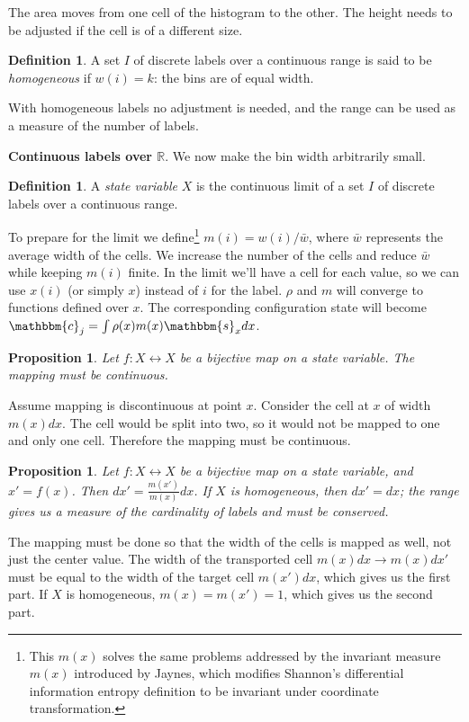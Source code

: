 \documentclass[aps,twocolumn,floatfix,nofootinbib]{revtex4}   %
\newtheorem{prop}[thm]{Proposition}
\theoremstyle{definition}
\newtheorem{defn}[thm]{Definition}
\begin{document}
The area moves from one cell of the histogram to the other. The height needs to be adjusted if the cell is of a different size.

\begin{defn}\label{discreteLabelHomogeneous}
A set $I$ of discrete labels over a continuous range is said to be \emph{homogeneous} if $w(i)=k$: the bins are of equal width.
\end{defn}

With homogeneous labels no adjustment is needed, and the range can be used as a measure of the number of labels.

\textbf{Continuous labels over $\mathbb{R}$}. We now make the bin width arbitrarily small.

\begin{defn}\label{continuousLabels}
A \emph{state variable} $X$ is the continuous limit of a set $I$ of discrete labels over a continuous range.
\end{defn}

To prepare for the limit we define\footnote{This $m(x)$ solves the same problems addressed by the invariant measure $m(x)$ introduced by Jaynes\cite{Jaynes}, which modifies Shannon's differential information entropy definition\cite{Shannon} to be invariant under coordinate transformation.} $m(i)=w(i)/\bar{w}$, where $\bar{w}$ represents the average width of the cells. We increase the number of the cells and reduce $\bar{w}$ while keeping $m(i)$ finite. In the limit we'll have a cell for each value, so we can use $x(i)$ (or simply $x$) instead of $i$ for the label. $\rho$ and $m$ will converge to functions defined over $x$. The corresponding configuration state will become $\mathbbm{c}_j=\int \rho(x) m(x) \mathbbm{s}_x dx$.

\begin{prop}\label{continuousMapping}
Let $f: X \leftrightarrow X$ be a bijective map on a state variable. The mapping must be continuous.
\end{prop}
Assume mapping is discontinuous at point $x$. Consider the cell at $x$ of width $m(x)dx$. The cell would be split into two, so it would not be mapped to one and only one cell. Therefore the mapping must be continuous.

\begin{prop}\label{widthMapping}
Let $f: X \leftrightarrow X$ be a bijective map on a state variable, and $x'=f(x)$. Then $dx' = \frac{m(x')}{m(x)} dx$. If $X$ is homogeneous, then $dx' = dx$; the range gives us a measure of the cardinality of labels and must be conserved.
\end{prop}
The mapping must be done so that the width of the cells is mapped as well, not just the center value. The width of the transported cell $m(x)dx \rightarrow m(x) dx'$ must be equal to the width of the target cell $m(x')dx$, which gives us the first part. If $X$ is homogeneous, $m(x)=m(x')=1$, which gives us the second part.
\end{document}
